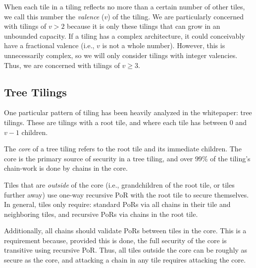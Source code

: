 \documentclass[a4paper,]{article}
\begin{document}
When each tile in a tiling reflects no more than a certain number of other tiles, we call this number the \emph{valence} ($v$) of the tiling.
We are particularly concerned with tilings of $v > 2$ because it is only these tilings that can grow in an unbounded capacity.
If a tiling has a complex architecture, it could conceivably have a fractional valence (i.e., $v$ is not a whole number).
However, this is unnecessarily complex, so we will only consider tilings with integer valencies.
Thus, we are concerned with tilings of $v \ge 3$.

\subsection{Tree Tilings}

One particular pattern of tiling has been heavily analyzed in the whitepaper: tree tilings.
These are tilings with a root tile, and where each tile has between $0$ and $v-1$ children.

The \emph{core} of a tree tiling refers to the root tile and its immediate children.
The core is the primary source of security in a tree tiling, and over $99\%$ of the tiling's chain-work is done by chains in the core.

Tiles that are \emph{outside} of the core (i.e., grandchildren of the root tile, or tiles further away) use one-way recursive PoR with the root tile to secure themselves.
In general, tiles only require: standard PoRs via all chains in their tile and neighboring tiles, and recursive PoRs via chains in the root tile.

Additionally, all chains should validate PoRs between tiles in the core.
This is a requirement because, provided this is done, the full security of the core is transitive using recursive PoR.
Thus, all tiles outside the core can be roughly as secure as the core, and attacking a chain in any tile requires attacking the core.
\end{document}
